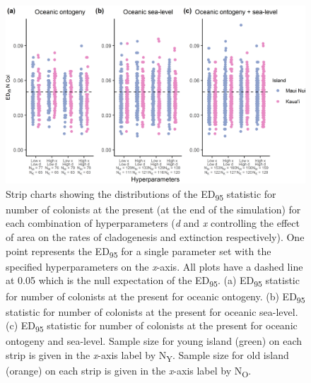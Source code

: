 \begin{figure}
    \centering
    \includegraphics{Hyperparameters_num_col.png}
    \caption{Strip charts showing the distributions of the ED\textsubscript{95} statistic for number of colonists at the present (at the end of the simulation) for each combination of hyperparameters (\textit{d} and \textit{x} controlling the effect of area on the rates of cladogenesis and extinction respectively). One point represents the ED\textsubscript{95} for a single parameter set with the specified hyperparameters on the \textit{x}-axis. All plots have a dashed line at 0.05 which is the null expectation of the ED\textsubscript{95}. (a) ED\textsubscript{95} statistic for number of colonists at the present for oceanic ontogeny. (b) ED\textsubscript{95} statistic for number of colonists at the present for oceanic sea-level. (c) ED\textsubscript{95} statistic for number of colonists at the present for oceanic ontogeny and sea-level. Sample size for young island (green) on each strip is given in the \textit{x}-axis label by N\textsubscript{Y}. Sample size for old island (orange) on each strip is given in the \textit{x}-axis label by N\textsubscript{O}.}
    \label{fig:Hyperparameters_num_col}
\end{figure}

